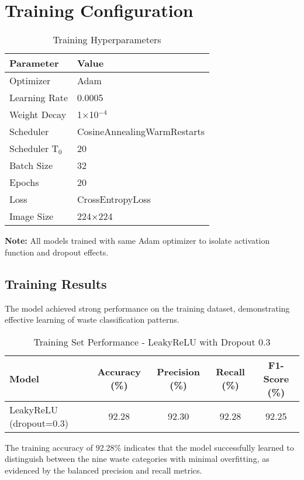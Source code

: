 \documentclass[12pt,a4paper]{article}
\begin{document}
\section{Training Configuration}

\begin{table}[H]
\centering
\caption{Training Hyperparameters}
\begin{tabular}{ll}
\toprule
\textbf{Parameter} & \textbf{Value} \\
\midrule
Optimizer & Adam \\
Learning Rate & 0.0005 \\
Weight Decay & 1×10$^{-4}$ \\
Scheduler & CosineAnnealingWarmRestarts \\
Scheduler T$_0$ & 20 \\
Batch Size & 32 \\
Epochs & 20 \\
Loss & CrossEntropyLoss \\
Image Size & 224×224 \\
\bottomrule
\end{tabular}
\end{table}

\textbf{Note:} All models trained with same Adam optimizer to isolate activation function and dropout effects.

\subsection{Training Results}

The model achieved strong performance on the training dataset, demonstrating effective learning of waste classification patterns.

\begin{table}[H]
\centering
\caption{Training Set Performance - LeakyReLU with Dropout 0.3}
\begin{tabular}{lcccc}
\toprule
\textbf{Model} & \textbf{Accuracy (\%)} & \textbf{Precision (\%)} & \textbf{Recall (\%)} & \textbf{F1-Score (\%)} \\
\midrule
LeakyReLU (dropout=0.3) & 92.28 & 92.30 & 92.28 & 92.25 \\
\bottomrule
\end{tabular}
\end{table}

The training accuracy of 92.28\% indicates that the model successfully learned to distinguish between the nine waste categories with minimal overfitting, as evidenced by the balanced precision and recall metrics.
\end{document}
